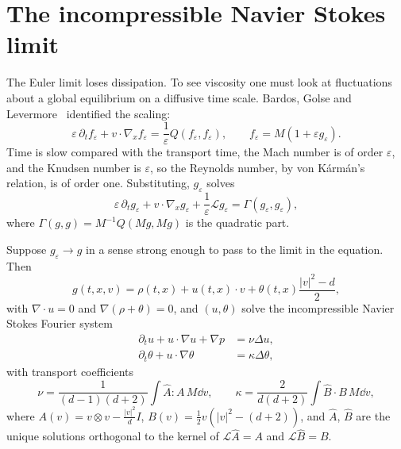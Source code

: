 \section{The incompressible Navier Stokes limit}

The Euler limit loses dissipation. To see viscosity one must look at fluctuations about a global equilibrium on a diffusive time scale. Bardos, Golse and Levermore~\cite{bgl1991} identified the scaling:
\begin{equation}
\varepsilon\,\partial_tf_\varepsilon+v\cdot\nabla_xf_\varepsilon = \frac1\varepsilon Q(f_\varepsilon,f_\varepsilon),\qquad f_\varepsilon = M(1+\varepsilon g_\varepsilon).
\label{eq:bgl_scaling}
\end{equation}
Time is slow compared with the transport time, the Mach number is of order $\varepsilon$, and the Knudsen number is $\varepsilon$, so the Reynolds number, by von K\'arm\'an's relation, is of order one. Substituting, $g_\varepsilon$ solves
\[
\varepsilon\,\partial_tg_\varepsilon+v\cdot\nabla_xg_\varepsilon+\frac1\varepsilon\mathcal{L}g_\varepsilon = \Gamma(g_\varepsilon,g_\varepsilon),
\]
where $\Gamma(g,g) = M^{-1}Q(Mg,Mg)$ is the quadratic part.

\begin{theorem}
\label{thm:bgl}
Suppose $g_\varepsilon\to g$ in a sense strong enough to pass to the limit in the equation. Then
\[
g(t,x,v) = \rho(t,x)+u(t,x)\cdot v+\theta(t,x)\frac{|v|^2-d}{2},
\]
with $\nabla\cdot u = 0$ and $\nabla(\rho+\theta) = 0$, and $(u,\theta)$ solve the incompressible Navier Stokes Fourier system
\begin{align*}
\partial_tu+u\cdot\nabla u+\nabla p &= \nu\Delta u,\\
\partial_t\theta+u\cdot\nabla\theta &= \kappa\Delta\theta,
\end{align*}
with transport coefficients
\[
\nu = \frac{1}{(d-1)(d+2)}\int\hat A:A\,M\dd v,\qquad\kappa = \frac{2}{d(d+2)}\int\hat B\cdot B\,M\dd v,
\]
where $A(v) = v\otimes v-\frac{|v|^2}{d}I$, $B(v) = \frac12v(|v|^2-(d+2))$, and $\hat A$, $\hat B$ are the unique solutions orthogonal to the kernel of $\mathcal{L}\hat A = A$ and $\mathcal{L}\hat B = B$.
\end{theorem}

